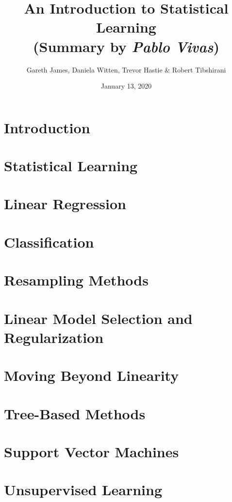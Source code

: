 \documentclass[12pt,a4paper]{article}
\author{Gareth James, Daniela Witten, Trevor Hastie \& Robert Tibshirani}
\title{An Introduction to Statistical Learning\\
\large{(Summary by \textit{Pablo Vivas})}}
\date{January 13, 2020}
\begin{document}
\maketitle
\section{Introduction}
\section{Statistical Learning}
\section{Linear Regression}
\section{Classification}
\section{Resampling Methods}
\section{Linear Model Selection and Regularization}
\section{Moving Beyond Linearity}
\section{Tree-Based Methods}
\section{Support Vector Machines}
\section{Unsupervised Learning}
\end{document}
